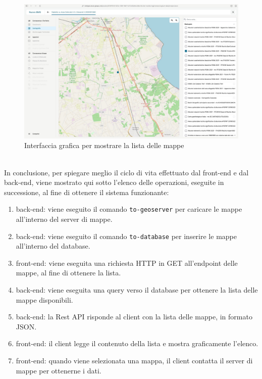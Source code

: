 \begin{figure}[htbp]
      \centering
      \includegraphics[width=1\textwidth]{Tesi/images/Capitolo7/listaMappe.jpg}
      \caption{Interfaccia grafica per mostrare la lista delle mappe}
      \label{fig:listaMappe}
\end{figure}
\\In conclusione, per spiegare meglio il ciclo di vita effettuato dal front-end e dal back-end, viene mostrato qui sotto l'elenco delle operazioni, eseguite in successione, al fine di ottenere il sistema funzionante:
\begin{enumerate}
    \item back-end: viene eseguito il comando \verb|to-geoserver| per caricare le mappe all'interno del server di mappe.
    \item back-end: viene eseguito il comando \verb|to-database| per inserire  le mappe all'interno del database.
    \item front-end: viene eseguita una richiesta HTTP in GET all'endpoint delle mappe, al fine di ottenere la lista.
    \item back-end: viene eseguita una query verso il database per ottenere la lista delle mappe disponibili.
    \item back-end: la Rest API risponde al client con la lista delle mappe, in formato JSON.
    \item front-end: il client legge il contenuto della lista e mostra graficamente l'elenco.
    \item front-end: quando viene selezionata una mappa, il client contatta il server di mappe per ottenerne i dati.
\end{enumerate}
